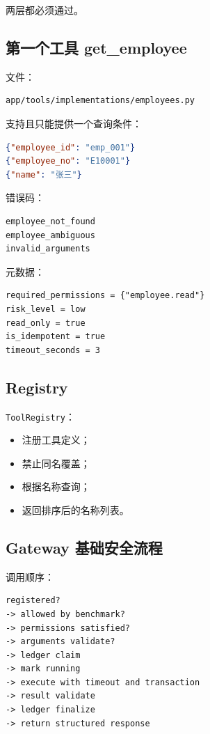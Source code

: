 \documentclass[11pt,a4paper]{ctexart}
\begin{document}
两层都必须通过。

\subsection{第一个工具 get\_employee}

文件：

\begin{lstlisting}
app/tools/implementations/employees.py
\end{lstlisting}

支持且只能提供一个查询条件：

\begin{lstlisting}[language=JSON]
{"employee_id": "emp_001"}
{"employee_no": "E10001"}
{"name": "张三"}
\end{lstlisting}

错误码：

\begin{lstlisting}
employee_not_found
employee_ambiguous
invalid_arguments
\end{lstlisting}

元数据：

\begin{lstlisting}
required_permissions = {"employee.read"}
risk_level = low
read_only = true
is_idempotent = true
timeout_seconds = 3
\end{lstlisting}

\subsection{Registry}

\texttt{ToolRegistry}：

\begin{itemize}[leftmargin=2em]
  \item 注册工具定义；
  \item 禁止同名覆盖；
  \item 根据名称查询；
  \item 返回排序后的名称列表。
\end{itemize}

\subsection{Gateway 基础安全流程}

调用顺序：

\begin{lstlisting}
registered?
-> allowed by benchmark?
-> permissions satisfied?
-> arguments validate?
-> ledger claim
-> mark running
-> execute with timeout and transaction
-> result validate
-> ledger finalize
-> return structured response
\end{lstlisting}
\end{document}
